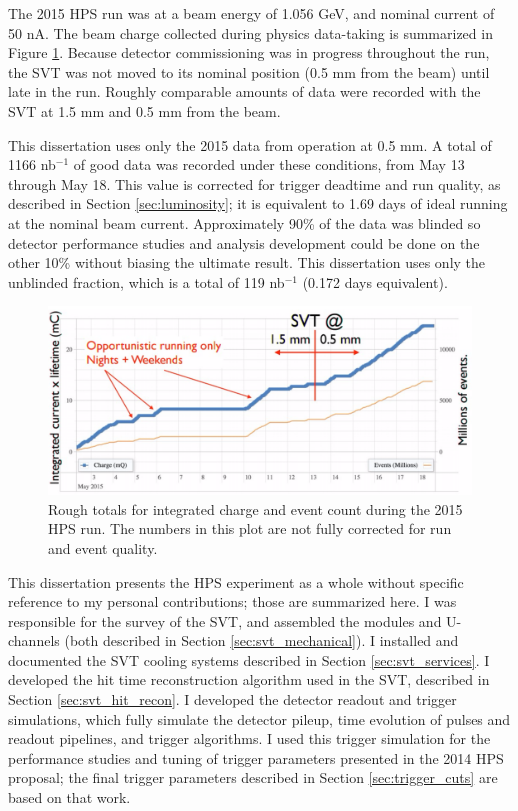 The 2015 HPS run was at a beam energy of 1.056 GeV, and nominal current of 50 nA.
The beam charge collected during physics data-taking is summarized in Figure \ref{fig:beamtime}.
Because detector commissioning was in progress throughout the run, the SVT was not moved to its nominal position (0.5 mm from the beam) until late in the run.
Roughly comparable amounts of data were recorded with the SVT at 1.5 mm and 0.5 mm from the beam.

This dissertation uses only the 2015 data from operation at 0.5 mm.
A total of 1166 nb$^{-1}$ of good data was recorded under these conditions, from May 13 through May 18.
This value is corrected for trigger deadtime and run quality, as described in Section \ref{sec:luminosity}; it is equivalent to 1.69 days of ideal running at the nominal beam current.
Approximately 90\% of the data was blinded so detector performance studies and analysis development could be done on the other 10\% without biasing the ultimate result.
This dissertation uses only the unblinded fraction, which is a total of 119 nb$^{-1}$ (0.172 days equivalent).

\begin{figure}[ht]
    \includegraphics[width=\textwidth]{intro/figs/engrun-beamtime}
    \caption{Rough totals for integrated charge and event count during the 2015 HPS run. The numbers in this plot are not fully corrected for run and event quality.}
    \label{fig:beamtime}
\end{figure}

This dissertation presents the HPS experiment as a whole without specific reference to my personal contributions; those are summarized here.
I was responsible for the survey of the SVT, and assembled the modules and U-channels (both described in Section \ref{sec:svt_mechanical}).
I installed and documented the SVT cooling systems described in Section \ref{sec:svt_services}.
I developed the hit time reconstruction algorithm used in the SVT, described in Section \ref{sec:svt_hit_recon}.
I developed the detector readout and trigger simulations, which fully simulate the detector pileup, time evolution of pulses and readout pipelines, and trigger algorithms.
I used this trigger simulation for the performance studies and tuning of trigger parameters presented in the 2014 HPS proposal; the final trigger parameters described in Section \ref{sec:trigger_cuts} are based on that work.


